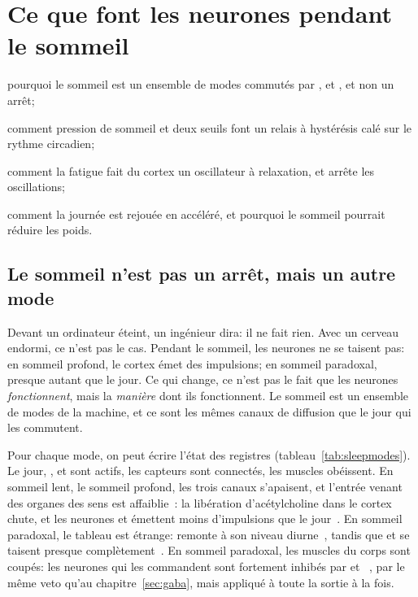 \chapter{Ce que font les neurones pendant le sommeil}
\label{sec:sleep}
\begin{chaptergoals}
\item pourquoi le sommeil est un ensemble de modes commutés par ,  et , et non un arrêt;
\item comment pression de sommeil et deux seuils font un relais à hystérésis calé sur le rythme circadien;
\item comment la fatigue fait du cortex un oscillateur à relaxation, et  arrête les oscillations;
\item comment la journée est rejouée en accéléré, et pourquoi le sommeil pourrait réduire les poids.
\end{chaptergoals}

\section{Le sommeil n'est pas un arrêt, mais un autre mode}

Devant un ordinateur éteint, un ingénieur dira: il ne fait rien. Avec un cerveau endormi, ce n'est pas le cas. Pendant le sommeil, les neurones ne se taisent pas: en sommeil profond, le cortex émet des impulsions; en sommeil paradoxal, presque autant que le jour. Ce qui change, ce n'est pas le fait que les neurones \emph{fonctionnent}, mais la \emph{manière} dont ils fonctionnent. Le sommeil est un ensemble de modes de la machine, et ce sont les mêmes canaux de diffusion que le jour qui les commutent.

Pour chaque mode, on peut écrire \og l'état des registres\fg{} (tableau~\ref{tab:sleepmodes}). Le jour, ,  et  sont actifs, les capteurs sont connectés, les muscles obéissent. En sommeil lent, le sommeil profond, les trois canaux s'apaisent, et l'entrée venant des organes des sens est affaiblie~\cite{Hasselmo1999}: la libération d'acétylcholine dans le cortex chute, et les neurones  et  émettent moins d'impulsions que le jour~\cite{Marrosu1995,AstonJonesBloom1981,McGintyHarper1976}. En sommeil paradoxal, le tableau est étrange:  remonte à son niveau diurne~\cite{Marrosu1995}, tandis que  et  se taisent presque complètement~\cite{AstonJonesBloom1981,McGintyHarper1976,JacobsAzmitia1992}. En sommeil paradoxal, les muscles du corps sont coupés: les neurones  qui les commandent sont fortement inhibés par  et ~\cite{BrooksPeever2012}, par le même veto qu'au chapitre~\ref{sec:gaba}, mais appliqué à toute la sortie à la fois.

